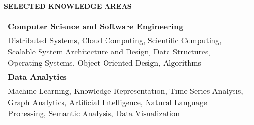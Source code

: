 \documentclass[10pt, letterpaper]{letter}
\newcommand{\highlightcolor}{RoyalBlue}
\newcommand{\sectionTitle}[1]{ \vspace{1em} \raggedright{ \color{\highlightcolor} \large \textbf{ \uppercase{ #1}}}}
\begin{document}


    \sectionTitle{Selected Knowledge Areas}

    \begin{tabularx}{\textwidth}{X}
        
            \textbf{Computer Science and Software Engineering} \\
            
            Distributed Systems, 
            Cloud Computing, 
            Scientific Computing, 
            Scalable System Architecture and Design, 
            Data Structures, 
            Operating Systems, 
            Object Oriented Design, 
            Algorithms \\
        
            \textbf{Data Analytics} \\
            
            Machine Learning, 
            Knowledge Representation, 
            Time Series Analysis, 
            Graph Analytics, 
            Artificial Intelligence, 
            Natural Language Processing, 
            Semantic Analysis, 
            Data Visualization \\
        
    \end{tabularx}
\end{document}

